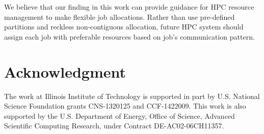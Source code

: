 \documentclass[conference]{IEEEtran}
\begin{document}
We believe that our finding in this work can provide guidance for HPC resource management to make flexible job allocations. Rather than use pre-defined partitions and reckless non-contiguous allocation, future HPC system should assign each job with preferable resources based on job's communication pattern. 

\section*{Acknowledgment}
\label{sec: ack}
The work at Illinois Institute of Technology is supported in part by U.S. National Science Foundation grants CNS-1320125 and CCF-1422009. This work is also supported by the U.S. Department of Energy, Office of Science, Advanced Scientific Computing Research, under Contract DE-AC02-06CH11357.
\end{document}
